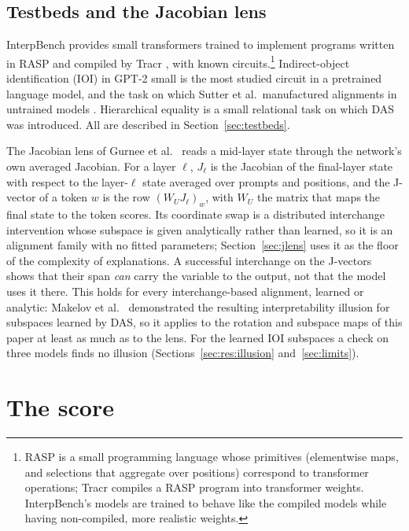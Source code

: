 \documentclass[11pt,a4paper]{article}
\begin{document}
\subsection{Testbeds and the Jacobian lens}
\label{sec:bg:testbeds}

InterpBench \cite{interpbench2024} provides small transformers trained to implement programs written in RASP and compiled by Tracr \cite{tracr2023}, with known circuits.\footnote{RASP is a small programming language whose primitives (elementwise maps, and selections that aggregate over positions) correspond to transformer operations; Tracr compiles a RASP program into transformer weights. InterpBench's models are trained to behave like the compiled models while having non-compiled, more realistic weights.} Indirect-object identification (IOI) in GPT-2 small \cite{radford2019,wang2023ioi} is the most studied circuit in a pretrained language model, and the task on which Sutter et al.\ manufactured alignments in untrained models \cite{sutter2025}. Hierarchical equality \cite{geiger2023relational,geiger2024das} is a small relational task on which DAS was introduced. All are described in Section~\ref{sec:testbeds}.

The Jacobian lens of Gurnee et al.\ \cite{gurnee2026workspace} reads a mid-layer state through the network's own averaged Jacobian. For a layer $\ell$, $J_\ell$ is the Jacobian of the final-layer state with respect to the layer-$\ell$ state averaged over prompts and positions, and the J-vector of a token $w$ is the row $(W_UJ_\ell)_w$, with $W_U$ the matrix that maps the final state to the token scores. Its coordinate swap is a distributed interchange intervention whose subspace is given analytically rather than learned, so it is an alignment family with no fitted parameters; Section~\ref{sec:jlens} uses it as the floor of the complexity of explanations. A successful interchange on the J-vectors shows that their span \emph{can} carry the variable to the output, not that the model uses it there. This holds for every interchange-based alignment, learned or analytic: Makelov et al.\ \cite{makelov2024} demonstrated the resulting interpretability illusion for subspaces learned by DAS, so it applies to the rotation and subspace maps of this paper at least as much as to the lens. For the learned IOI subspaces a check on three models finds no illusion (Sections~\ref{sec:res:illusion} and~\ref{sec:limits}).

\section{The score}
\label{sec:setup}
\end{document}
